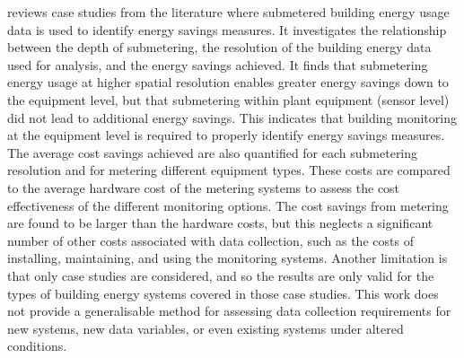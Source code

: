  reviews case studies from the literature where submetered building energy usage data is used to identify energy savings measures. It investigates the relationship between the depth of submetering, the resolution of the building energy data used for analysis, and the energy savings achieved. It finds that submetering energy usage at higher spatial resolution enables greater energy savings down to the equipment level, but that submetering within plant equipment (sensor level) did not lead to additional energy savings. This indicates that building monitoring at the equipment level is required to properly identify energy savings measures. The average cost savings achieved are also quantified for each submetering resolution and for metering different equipment types. These costs are compared to the average hardware cost of the metering systems to assess the cost effectiveness of the different monitoring options. The cost savings from metering are found to be larger than the hardware costs, but this neglects a significant number of other costs associated with data collection, such as the costs of installing, maintaining, and using the monitoring systems. Another limitation is that only case studies are considered, and so the results are only valid for the types of building energy systems covered in those case studies. This work does not provide a generalisable method for assessing data collection requirements for new systems, new data variables, or even existing systems under altered conditions.

